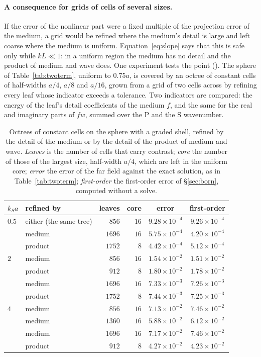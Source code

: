 \documentclass[11pt,a4paper]{article}
\begin{document}
\paragraph{A consequence for grids of cells of several sizes.} If the error of the nonlinear part were a
fixed multiple of the projection error of the medium, a grid would be refined where the medium's detail
is large and left coarse where the medium is uniform. Equation~\eqref{eq:slope} says that this is safe
only while $kL\ll1$: in a uniform region the medium has no detail and the product of medium and wave
does. One experiment tests the point (). The sphere of
Table~\ref{tab:twoterm}, uniform to $0.75a$, is covered by an octree of constant cells of half-widths
$a/4$, $a/8$ and $a/16$, grown from a grid of two cells across by refining every leaf whose indicator
exceeds a tolerance. Two indicators are compared: the energy of the leaf's detail coefficients of the
medium $f$, and the same for the real and imaginary parts of $fw$, summed over the P and the S wavenumber.
\begin{table}[htbp]
\centering
\caption{Octrees of constant cells on the sphere with a graded shell, refined by the detail of the medium
or by the detail of the product of medium and wave. \emph{Leaves} is the number of cells that carry
contrast; \emph{core} the number of those of the largest size, half-width $a/4$, which are left in the
uniform core; \emph{error} the error of the far field against the exact solution, as in
Table~\ref{tab:twoterm}; \emph{first-order} the first-order error of \S\ref{sec:born}, computed without
a solve.}\label{tab:trees}
\small
\begin{tabular}{@{}llrrcc@{}}
\toprule
$k_Sa$ & refined by & leaves & core & error & first-order \\
\midrule
$0.5$ & either (the same tree) & $856$ & $16$ & $9.28\times10^{-4}$ & $9.26\times10^{-4}$ \\
      & medium  & $1696$ & $16$ & $5.75\times10^{-4}$ & $4.20\times10^{-4}$ \\
      & product & $1752$ & $8$  & $4.42\times10^{-4}$ & $5.12\times10^{-4}$ \\
\midrule
$2$ & medium  & $856$  & $16$ & $1.54\times10^{-2}$ & $1.51\times10^{-2}$ \\
    & product & $912$  & $8$  & $1.80\times10^{-2}$ & $1.78\times10^{-2}$ \\
    & medium  & $1696$ & $16$ & $7.33\times10^{-3}$ & $7.26\times10^{-3}$ \\
    & product & $1752$ & $8$  & $7.44\times10^{-3}$ & $7.25\times10^{-3}$ \\
\midrule
$4$ & medium  & $856$  & $16$ & $7.13\times10^{-2}$ & $7.46\times10^{-2}$ \\
    & medium  & $1360$ & $16$ & $5.88\times10^{-2}$ & $6.12\times10^{-2}$ \\
    & medium  & $1696$ & $16$ & $7.17\times10^{-2}$ & $7.46\times10^{-2}$ \\
    & product & $912$  & $8$  & $4.27\times10^{-2}$ & $4.23\times10^{-2}$ \\
\bottomrule
\end{tabular}
\end{table}
\end{document}
